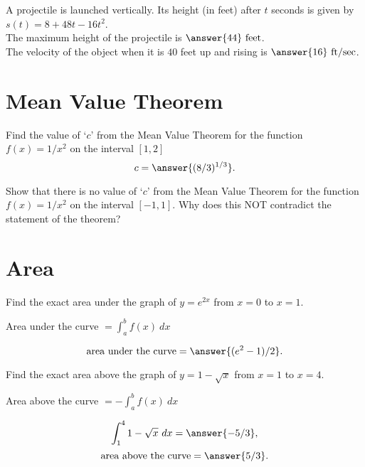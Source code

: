 \documentclass[handout]{ximera}
\begin{document}
\begin{problem}
A projectile is launched vertically.  Its height (in feet) after $t$ seconds is given by
$s(t) = 8 + 48t -16t^2$.\\

The maximum height of the projectile is $\answer{44} \ \text{feet}$.\\
The velocity of the object when it is $40$ feet up and rising is $\answer{16} \ \text{ft/sec}$.
\end{problem}


\section{Mean Value Theorem}

\begin{problem}
Find the value of `$c$' from the Mean Value Theorem for the function $f(x) = 1/x^2$ on the interval 
$[1,2]$
\[c=\answer{(8/3)^{1/3}}.\]
\end{problem}

\begin{problem}
Show that there is no value of `$c$' from the Mean Value Theorem for the function 
$f(x) = 1/x^2$ on the interval $[-1, 1]$.  Why does this NOT contradict the statement of the theorem?
\end{problem}

\section{Area}


\begin{problem}
Find the exact area under the graph of $y = e^{2x}$ from $x = 0$ to $x = 1$. \\
\begin{hint}
Area under the curve $= \int_a^b f(x) \ dx$
\end{hint}

\[\text{area under the curve} = \answer{(e^2 -1)/2}.\]
\end{problem}


\begin{problem}
Find the exact area above the graph of $y = 1 - \sqrt x$ from $x = 1$ to $x = 4$. \\
\begin{hint}
Area above the curve $= -\int_a^b f(x) \ dx$
\end{hint}
\[\int_1^4 1 - \sqrt x \ dx = \answer{-5/3},\]
\[\text{area above the curve} = \answer{5/3}.\]
\end{problem}
\end{document}
